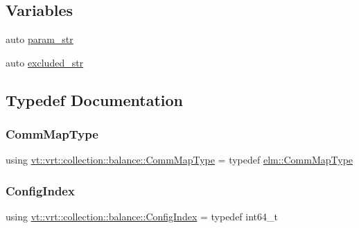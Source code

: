 \subsection*{Variables}
\begin{DoxyCompactItemize}
\item 
auto \hyperlink{namespacevt_1_1vrt_1_1collection_1_1balance_aaed7e09146a45c2932ca185a55161723}{param\+\_\+str}
\item 
auto \hyperlink{namespacevt_1_1vrt_1_1collection_1_1balance_af2f6674ecc7191ddbfe31e87569fe334}{excluded\+\_\+str}
\end{DoxyCompactItemize}


\subsection{Typedef Documentation}
\mbox{\label{namespacevt_1_1vrt_1_1collection_1_1balance_a01ee1fb0ae2da1d2ab7fdca3be9ae351}} 
\subsubsection{\texorpdfstring{Comm\+Map\+Type}{CommMapType}}
{\footnotesize\ttfamily using \hyperlink{namespacevt_1_1vrt_1_1collection_1_1balance_a01ee1fb0ae2da1d2ab7fdca3be9ae351}{vt\+::vrt\+::collection\+::balance\+::\+Comm\+Map\+Type} = typedef \hyperlink{namespacevt_1_1elm_a38487cb8896b9b4763efa9022fab560e}{elm\+::\+Comm\+Map\+Type}}

\mbox{\label{namespacevt_1_1vrt_1_1collection_1_1balance_ac1bb9eee8129549177880dbb4e5f6a34}} 
\subsubsection{\texorpdfstring{Config\+Index}{ConfigIndex}}
{\footnotesize\ttfamily using \hyperlink{namespacevt_1_1vrt_1_1collection_1_1balance_ac1bb9eee8129549177880dbb4e5f6a34}{vt\+::vrt\+::collection\+::balance\+::\+Config\+Index} = typedef int64\+\_\+t}


